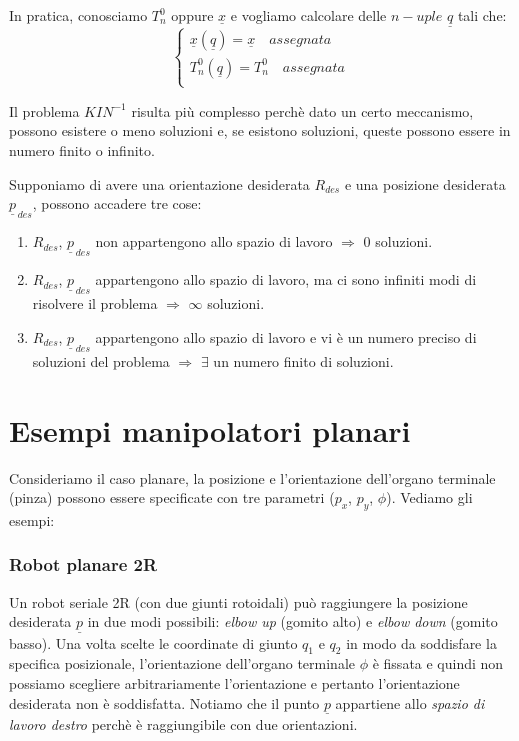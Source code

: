 In pratica, conosciamo $T_n^0$ oppure $\underline{x}$ e vogliamo calcolare delle $n-uple$ $\underline{q}$ tali che:
\begin{equation*}
	\begin{cases}
		\underline{x}(\underline{q}) = \underline{x} \quad assegnata \\
		T_n^0(\underline{q}) = T_n^0 \quad assegnata \\
	\end{cases}
\end{equation*}

Il problema $KIN^{-1}$ risulta più complesso perchè dato un certo meccanismo, possono esistere o meno soluzioni e, se esistono soluzioni, queste possono essere in numero finito o infinito.

Supponiamo di avere una orientazione desiderata $R_{des}$ e una posizione desiderata $\underline{p}_{\,des}$, possono accadere tre cose:
\begin{enumerate}
	\item $R_{des}$, $\underline{p}_{\,des}$ non appartengono allo spazio di lavoro $\Rightarrow$ $0$ soluzioni.
	\item $R_{des}$, $\underline{p}_{\,des}$ appartengono allo spazio di lavoro, ma ci sono infiniti modi di risolvere il problema $\Rightarrow$ $\infty$ soluzioni.
	\item $R_{des}$, $\underline{p}_{\,des}$ appartengono allo spazio di lavoro e vi è un numero preciso di soluzioni del problema $\Rightarrow$ $\exists$ un numero finito di soluzioni.
\end{enumerate}
\newpage

\section{Esempi manipolatori planari}
Consideriamo il caso planare, la posizione e l'orientazione dell'organo terminale (pinza) possono essere specificate con tre parametri ($p_x$, $p_y$, $\phi$). Vediamo gli esempi:

\subsubsection{Robot planare 2R}
Un robot seriale 2R (con due giunti rotoidali) può raggiungere la posizione desiderata $\underline{p}$ in due modi possibili: \emph{elbow up} (gomito alto) e \emph{elbow down} (gomito basso). Una volta scelte le coordinate di giunto $q_1$ e $q_2$ in modo da soddisfare la specifica posizionale, l'orientazione dell'organo terminale $\phi$ è fissata e quindi non possiamo scegliere arbitrariamente l'orientazione e pertanto l'orientazione desiderata non è soddisfatta. Notiamo che il punto $\underline{p}$ appartiene allo \emph{spazio di lavoro destro} perchè è raggiungibile con due orientazioni. 

